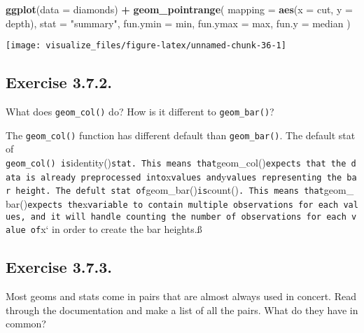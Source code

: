 \documentclass[]{book}
\newenvironment{Shaded}{\begin{snugshade}}{\end{snugshade}}
\newcommand{\DataTypeTok}[1]{\textcolor[rgb]{0.13,0.29,0.53}{#1}}
\newcommand{\KeywordTok}[1]{\textcolor[rgb]{0.13,0.29,0.53}{\textbf{#1}}}
\newcommand{\NormalTok}[1]{#1}
\newcommand{\OperatorTok}[1]{\textcolor[rgb]{0.81,0.36,0.00}{\textbf{#1}}}
\newcommand{\StringTok}[1]{\textcolor[rgb]{0.31,0.60,0.02}{#1}}
\theoremstyle{plain}
\theoremstyle{remark}
\theoremstyle{definition}
\theoremstyle{definition}
\theoremstyle{definition}
\theoremstyle{remark}
\begin{document}
\begin{Shaded}
\begin{Highlighting}[]
\KeywordTok{ggplot}\NormalTok{(}\DataTypeTok{data =}\NormalTok{ diamonds) }\OperatorTok{+}
\StringTok{  }\KeywordTok{geom_pointrange}\NormalTok{(}
    \DataTypeTok{mapping =} \KeywordTok{aes}\NormalTok{(}\DataTypeTok{x =}\NormalTok{ cut, }\DataTypeTok{y =}\NormalTok{ depth),}
    \DataTypeTok{stat =} \StringTok{"summary"}\NormalTok{,}
    \DataTypeTok{fun.ymin =}\NormalTok{ min,}
    \DataTypeTok{fun.ymax =}\NormalTok{ max,}
    \DataTypeTok{fun.y =}\NormalTok{ median}
\NormalTok{  )}
\end{Highlighting}
\end{Shaded}

\begin{center}\texttt{[image: visualize\_files/figure-latex/unnamed-chunk-36-1]} \end{center}

\hypertarget{exercise-3.7.2.}{%
\subsection*{\texorpdfstring{Exercise
{3.7.2}.}{Exercise 3.7.2.}}\label{exercise-3.7.2.}}

What does \texttt{geom\_col()} do? How is it different to
\texttt{geom\_bar()}?

The \texttt{geom\_col()} function has different default than
\texttt{geom\_bar()}. The default stat of
\texttt{geom\_col()\ is}identity()\texttt{stat.\ This\ means\ that}geom\_col()\texttt{expects\ that\ the\ data\ is\ already\ preprocessed\ into}x\texttt{values\ and}y\texttt{values\ representing\ the\ bar\ height.\ The\ defult\ stat\ of}geom\_bar()\texttt{is}count()\texttt{.\ This\ means\ that}geom\_bar()\texttt{expects\ the}x\texttt{variable\ to\ contain\ multiple\ observations\ for\ each\ values,\ and\ it\ will\ handle\ counting\ the\ number\ of\ observations\ for\ each\ value\ of}x`
in order to create the bar heights.ß

\hypertarget{exercise-3.7.3.}{%
\subsection*{\texorpdfstring{Exercise
{3.7.3}.}{Exercise 3.7.3.}}\label{exercise-3.7.3.}}

Most geoms and stats come in pairs that are almost always used in
concert. Read through the documentation and make a list of all the
pairs. What do they have in common?
\end{document}

